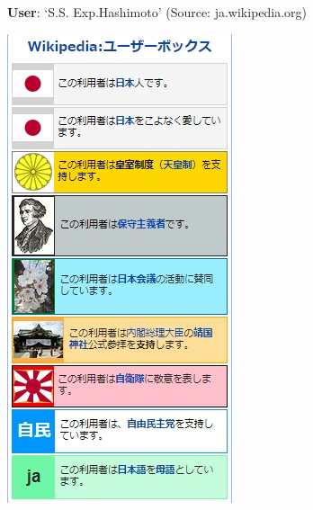 \documentclass[10pt,british,A4paper,oneside]{memoir}
\begin{document}
\begin{figure}[!htb]
\begin{subfigure}[b]{0.3\textwidth}
 \caption{\textbf{User}: `S.S. Exp.Hashimoto' (Source: ja.wikipedia.org)}
 \label{fig:hashimoto}
 \end{subfigure}
 \begin{subfigure}[b]{0.3\textwidth}
 \includegraphics[width=\textwidth]{images/wiki/defense-corps.jpg}

\end{subfigure}
\end{figure}
\end{document}
